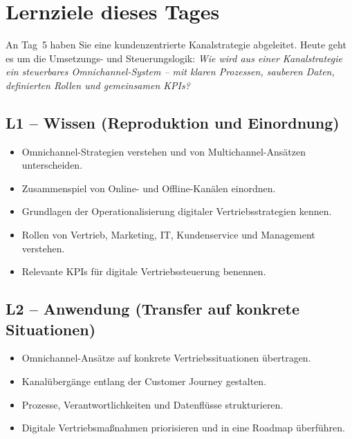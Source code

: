 \documentclass[11pt,a4paper,oneside]{article}
\begin{document}
\section*{Lernziele dieses Tages}
\thispagestyle{plain}

\noindent An Tag~5 haben Sie eine kundenzentrierte Kanalstrategie abgeleitet. Heute geht es um die Umsetzungs- und Steuerungslogik: \emph{Wie wird aus einer Kanalstrategie ein steuerbares Omnichannel-System -- mit klaren Prozessen, sauberen Daten, definierten Rollen und gemeinsamen KPIs?}

\subsection*{L1 -- Wissen (Reproduktion und Einordnung)}
\begin{itemize}
  \item Omnichannel-Strategien verstehen und von Multichannel-Ansätzen unterscheiden.
  \item Zusammenspiel von Online- und Offline-Kanälen einordnen.
  \item Grundlagen der Operationalisierung digitaler Vertriebsstrategien kennen.
  \item Rollen von Vertrieb, Marketing, IT, Kundenservice und Management verstehen.
  \item Relevante KPIs für digitale Vertriebssteuerung benennen.
\end{itemize}

\subsection*{L2 -- Anwendung (Transfer auf konkrete Situationen)}
\begin{itemize}
  \item Omnichannel-Ansätze auf konkrete Vertriebssituationen übertragen.
  \item Kanalübergänge entlang der Customer Journey gestalten.
  \item Prozesse, Verantwortlichkeiten und Datenflüsse strukturieren.
  \item Digitale Vertriebsmaßnahmen priorisieren und in eine Roadmap überführen.
\end{itemize}
\end{document}
